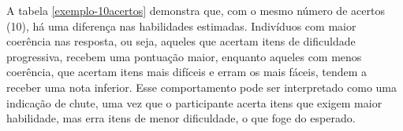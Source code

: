 A tabela \ref{exemplo-10acertos} demonstra que, com o mesmo número de acertos (10), há uma diferença nas habilidades estimadas. Indivíduos com maior coerência nas resposta, ou seja, aqueles que acertam itens de dificuldade progressiva, recebem uma pontuação maior, enquanto aqueles com menos coerência, que acertam itens mais difíceis e erram os mais fáceis, tendem a receber uma nota inferior. Esse comportamento pode ser interpretado como uma indicação de chute, uma vez que o participante acerta itens que exigem maior habilidade, mas erra itens de menor dificuldade, o que foge do esperado.


